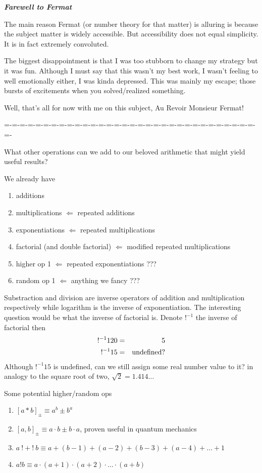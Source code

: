 \documentclass[aps,preprint,preprintnumbers,nofootinbib,showpacs,prd]{revtex4-1}
\newcommand{\nbea}{\begin{eqnarray*}}
\newcommand{\neea}{\end{eqnarray*}}
\begin{document}
\bigskip\textbf{\textit{Farewell to Fermat}}

The main reason Fermat (or number theory for that matter) is alluring is because the subject matter is widely accessible. But accessibility does not equal simplicity. It is in fact extremely convoluted. 

The biggest disappointment is that I was too stubborn to change my strategy but it was fun. Although I must say that this wasn't my best work, I wasn't feeling to well emotionally either, I was kinda depressed. This was mainly my escape; those bursts of excitements when you solved/realized something.

Well, that's all for now with me on this subject, Au Revoir Monsieur Fermat!

=-=-=-=-=-=-=-=-=-=-=-=-=-=-=-=-=-=-=-=-=-=-=-=-=-=-=-=-=-=-=-=-=-

What other operations can we add to our beloved arithmetic that might yield useful results?

We already have
\begin{enumerate}
\item additions
\item multiplications $\Leftarrow$ repeated additions
\item exponentiations $\Leftarrow$ repeated multiplications
\item factorial (and double factorial) $\Leftarrow$ modified repeated multiplications
\item higher op 1 $\Leftarrow$ repeated exponentiations ???
\item random op 1 $\Leftarrow$ anything we fancy ???
\end{enumerate}

Substraction and division are inverse operators of addition and multiplication respectively while logarithm is the inverse of exponentiation. The interesting question would be what the inverse of factorial is. Denote $!^{-1}$ the inverse of factorial then
%
\nbea
!^{-1}120 & = & 5 \\
!^{-1}15 & = & {\rm undefined?}
\neea
%
Although $!^{-1}15$ is undefined, can we still assign some real number value to it? in analogy to the square root of two, $\sqrt{2} = 1.414 \dots$

Some potential higher/random ops
\begin{enumerate}
\item $[a * b]_{\pm} \equiv a^b \pm b^a $ 
\item $[a, b]_{\pm} \equiv a \cdot b \pm b \cdot a $, proven useful in quantum mechanics
\item $a~!+!~b \equiv a + (b-1) + (a-2) + (b-3) + (a-4) + \dots + 1$
\item $a!b \equiv a \cdot (a+1) \cdot (a+2) \cdot \dots \cdot (a+b)$
\end{enumerate}
\end{document}
